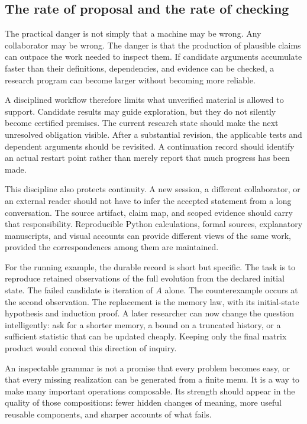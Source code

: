 \subsection{The rate of proposal and the rate of checking}

The practical danger is not simply that a machine may be wrong. Any collaborator may be wrong. The danger is that the production of plausible claims can outpace the work needed to inspect them. If candidate arguments accumulate faster than their definitions, dependencies, and evidence can be checked, a research program can become larger without becoming more reliable.

A disciplined workflow therefore limits what unverified material is allowed to support. Candidate results may guide exploration, but they do not silently become certified premises. The current research state should make the next unresolved obligation visible. After a substantial revision, the applicable tests and dependent arguments should be revisited. A continuation record should identify an actual restart point rather than merely report that much progress has been made.

This discipline also protects continuity. A new session, a different collaborator, or an external reader should not have to infer the accepted statement from a long conversation. The source artifact, claim map, and scoped evidence should carry that responsibility. Reproducible Python calculations, formal sources, explanatory manuscripts, and visual accounts can provide different views of the same work, provided the correspondences among them are maintained.

For the running example, the durable record is short but specific. The task is to reproduce retained observations of the full evolution from the declared initial state. The failed candidate is iteration of \(A\) alone. The counterexample occurs at the second observation. The replacement is the memory law, with its initial-state hypothesis and induction proof. A later researcher can now change the question intelligently: ask for a shorter memory, a bound on a truncated history, or a sufficient statistic that can be updated cheaply. Keeping only the final matrix product would conceal this direction of inquiry.

An inspectable grammar is not a promise that every problem becomes easy, or that every missing realization can be generated from a finite menu. It is a way to make many important operations composable. Its strength should appear in the quality of those compositions: fewer hidden changes of meaning, more useful reusable components, and sharper accounts of what fails.


